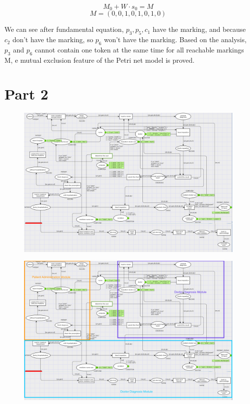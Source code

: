 \documentclass{article}
\begin{document}
$$M_0 + W \cdot s_0 = M$$
$$M= (0,0,1,0,1,0,1,0)$$

We can see after fundamental equation, $p_3, p_5, c_1$ have the marking, and because $c_2$ don't have the marking, so $p_6$ won't have the marking. Based on the analysis, $p_3$ and $p_6$ cannot contain one token at the same time for all reachable markings M, e mutual exclusion feature of the Petri net model is proved.



\section{Part 2}
\begin{figure}[H]
  \includegraphics[width=1\textwidth]{Fig2-1}
\end{figure}

\begin{figure}[H]
  \includegraphics[width=1\textwidth]{Fig2-2}
\end{figure}
\end{document}
